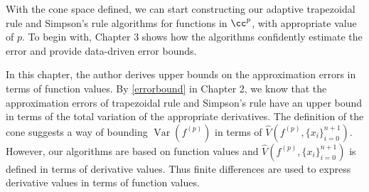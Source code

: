 \documentclass{iitthesis}
\DeclareMathOperator{\Var}{Var}
\theoremstyle{definition}
\theoremstyle{remark}
\begin{document}
With the cone space defined, we can start constructing our adaptive trapezoidal rule and Simpson's rule algorithms for functions in $\cc^{p}$, with appropriate value of $p$. To begin with, Chapter 3 shows how the algorithms confidently estimate the error and provide data-driven error bounds.





In this chapter, the author derives upper bounds on the approximation errors in terms of function values. By \eqref{errorbound} in Chapter 2, we know that the approximation errors of trapezoidal rule and Simpson's rule have an upper bound in terms of the total variation of the appropriate derivatives. The definition of the cone suggests a way of bounding $\Var(f^{(p)})$ in terms of $\widehat{V}(f^{(p)},\{x_i\}_{i=0}^{n+1})$. However, our algorithms are based on function values and $\widehat{V}(f^{(p)},\{x_i\}_{i=0}^{n+1})$ is defined in terms of derivative values. Thus finite differences are used to express derivative values in terms of function values.

\end{document}
